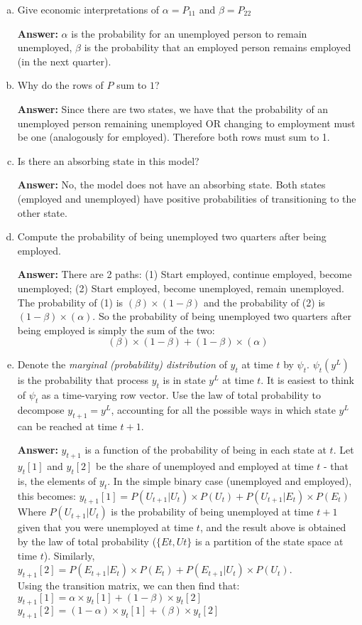 \documentclass[11pt]{extarticle}
\theoremstyle{plain}
\theoremstyle{definition}
\begin{document}
\vspace{5mm}
\noindent
\begin{enumerate}[(a)]
\item Give economic interpretations of $\alpha = P_{11}$ and $\beta = P_{22}$

\textbf{Answer:} $\alpha$ is the probability for an unemployed person to remain unemployed, $\beta$ is the probability that an employed person remains employed (in the next quarter).
\item Why do the rows of $P$ sum to $1$?

\textbf{Answer:} Since there are two states, we have that the probability of an unemployed person remaining unemployed OR changing to employment must be one (analogously for employed). Therefore both rows must sum to 1.
\item Is there an absorbing state in this model?

\textbf{Answer:} No, the model does not have an absorbing state. Both states (employed and unemployed) have positive probabilities of transitioning to the other state.
\item Compute the probability of being unemployed two quarters after being employed. 

\textbf{Answer:} There are 2 paths: (1) Start employed, continue employed, become unemployed; (2) Start employed, become unemployed, remain unemployed.\\
The probability of (1) is $(\beta)\times (1-\beta)$ and the probability of (2) is $(1-\beta)\times (\alpha)$. So the probability of being unemployed two quarters after being employed is simply the sum of the two: 
$$(\beta)\times (1-\beta) + (1-\beta)\times (\alpha)$$
\item Denote the \textit{marginal (probability) distribution} of $y_t$ at time $t$ by $\psi_t$. $\psi_t(y^L)$ is the probability that process $y_t$ is in state $y^L$ at time $t$. It is easiest to think of $\psi_t$ as a time-varying row vector. Use the law of total probability to decompose $y_{t+1} = y^L$, accounting for all the possible ways in which state $y^L$ can be reached at time $t+1$. 

\textbf{Answer:} $y_{t+1}$ is a function of the probability of being in each state at $t$. Let $y_{t}[1]$ and $y_{t}[2]$ be the share of unemployed and employed at time $t$ - that is, the elements of $y_{t}$. In the simple binary case (unemployed and employed), this becomes:
$y_{t+1}[1] = P(U_{t+1}|U_{t})\times P(U_{t}) + P(U_{t+1}|E_{t})\times P(E_{t})$
Where $P(U_{t+1}|U_{t})$ is the probability of being unemployed at time $t+1$ given that you were unemployed at time $t$, and the result above is obtained by the law of total probability ($\{E{t},U{t} \}$ is a partition of the state space at time $t$). Similarly,
$y_{t+1}[2] = P(E_{t+1}|E_{t})\times P(E_{t}) + P(E_{t+1}|U_{t})\times P(U_{t})$.\\
Using the transition matrix, we can then find that: 
$y_{t+1}[1] = \alpha \times y_{t}[1] + (1-\beta) \times y_{t}[2]$
$y_{t+1}[2] = (1-\alpha) \times y_{t}[1] + (\beta) \times y_{t}[2]$


\end{enumerate}
\end{document}
